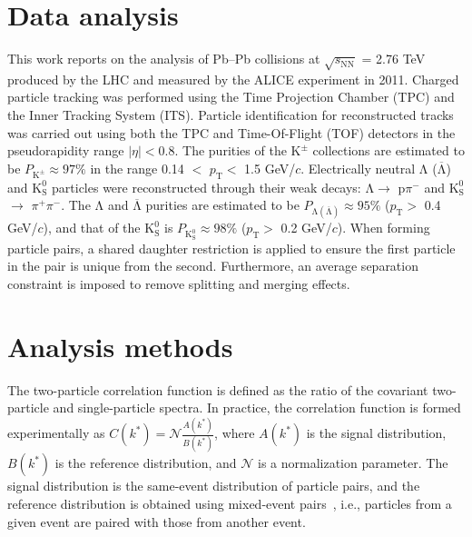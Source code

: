 \documentclass{svproc}
\newcommand{\pt}{$p_{\mathrm{T}}$\xspace}
\newcommand{\Lam}{$\mathrm{\Lambda}$\xspace}
\newcommand{\ALam}{$\overline{\mathrm{\Lambda}}$\xspace}
\newcommand{\LamALam}{$\mathrm{\Lambda}$ ($\overline{\mathrm{\Lambda}}$)\xspace}
\newcommand{\Kpm}{$\mathrm{K^{\pm}}$\xspace}
\newcommand{\Ks}{$\mathrm{K^{0}_{S}}$\xspace}
\begin{document}
\section{Data analysis}
\label{sec:DataAnalysis}

This work reports on the analysis of Pb--Pb collisions at $\sqrt{s_{\mathrm{NN}}}$ = 2.76 TeV produced by the LHC and measured by the ALICE experiment in 2011.
Charged particle tracking was performed using the Time Projection Chamber (TPC) and the Inner Tracking System (ITS).  
Particle identification for reconstructed tracks was carried out using both the TPC and Time-Of-Flight (TOF) detectors in the pseudorapidity range $|\eta| < 0.8$.  
The purities of the \Kpm collections are estimated to be $P_{\mathrm{K}^{\pm}} \approx 97\%$ in the range 0.14 $<$ \pt $<$ 1.5 GeV/$c$.
Electrically neutral \LamALam and \Ks particles were reconstructed through their weak decays: \Lam $\rightarrow$ p$\pi^{-}$ and \Ks $\rightarrow$ $\pi^{+}\pi^{-}$.
The \Lam and \ALam purities are estimated to be $P_{\mathrm{\Lambda}(\overline{\mathrm{\Lambda}})} \approx 95\%$ ($p_{\mathrm{T}} >$ 0.4 GeV/$c$), and that of the \Ks is $P_{\mathrm{K^{0}_{S}}} \approx 98\%$ ($p_{\mathrm{T}} >$ 0.2 GeV/$c$).
When forming particle pairs, a shared daughter restriction is applied to ensure the first particle in the pair is unique from the second. 
Furthermore, an average separation constraint is imposed to remove splitting and merging effects.


\section{Analysis methods}
\label{sec:AnalysisMethods}
The two-particle correlation function is defined as the ratio of the covariant two-particle and single-particle spectra.
In practice, the correlation function is formed experimentally as $C(k^{*}) = \mathcal{N}\frac{A(k^{*})}{B(k^{*})}$, where $A(k^{*})$ is the signal distribution, $B(k^{*})$ is the reference distribution, and $\mathcal{N}$ is a normalization parameter. 
The signal distribution is the same-event distribution of particle pairs, and the reference distribution is obtained using mixed-event pairs~\cite{Kopylov:1974th}, i.e., particles from a given event are paired with those from another event.
\end{document}
